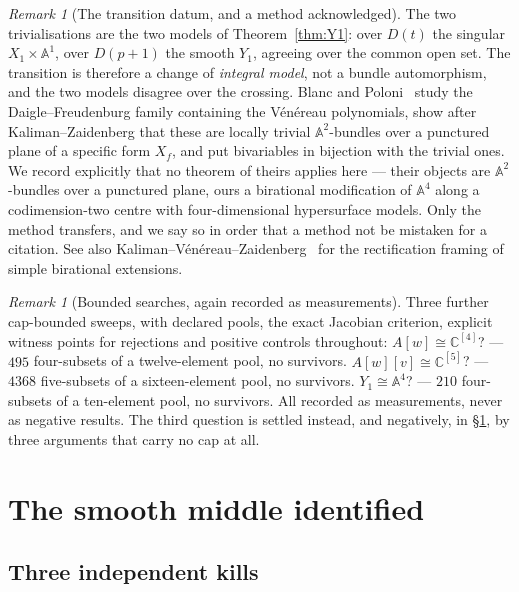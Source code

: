 \documentclass[11pt]{article}
\theoremstyle{definition}
\theoremstyle{remark}
\newtheorem{remark}[theorem]{Remark}
\newcommand{\C}{\mathbb{C}}
\newcommand{\Aff}[1]{\mathbb{A}^{#1}}
\begin{document}
\begin{remark}[The transition datum, and a method
acknowledged]\label{rem:blancpoloni}
The two trivialisations are the two models of Theorem~\ref{thm:Y1}: over
$D(t)$ the singular $X_1\times\Aff{1}$, over $D(p+1)$ the smooth $Y_1$,
agreeing over the common open set. The transition is therefore a change of
\emph{integral model}, not a bundle automorphism, and the two models disagree
over the crossing. Blanc and Poloni~\cite{BP2020} study the
Daigle--Freudenburg family containing the V\'en\'ereau polynomials, show after
Kaliman--Zaidenberg that these are locally trivial $\Aff{2}$-bundles over a
punctured plane of a specific form $X_f$, and put bivariables in bijection with
the trivial ones. We record explicitly that no theorem of theirs applies here
--- their objects are $\Aff{2}$-bundles over a punctured plane, ours a
birational modification of $\Aff{4}$ along a codimension-two centre with
four-dimensional hypersurface models. Only the method transfers, and we say so
in order that a method not be mistaken for a citation. See also
Kaliman--V\'en\'ereau--Zaidenberg~\cite{KVZ2001} for the rectification framing
of simple birational extensions.
\end{remark}

\begin{remark}[Bounded searches, again recorded as
measurements]\label{rem:sweeps2}
Three further cap-bounded sweeps, with declared pools, the exact Jacobian
criterion, explicit witness points for rejections and positive controls
throughout: $A[w]\cong\C^{[4]}$? --- $495$ four-subsets of a twelve-element
pool, no survivors. $A[w][v]\cong\C^{[5]}$? --- $4368$ five-subsets of a
sixteen-element pool, no survivors. $Y_1\cong\Aff{4}$? --- $210$ four-subsets
of a ten-element pool, no survivors. All recorded as measurements, never as
negative results. The third question is settled instead, and negatively, in
\S\ref{sec:Y1}, by three arguments that carry no cap at all.
\end{remark}

\section{The smooth middle identified}\label{sec:Y1}

\subsection{Three independent kills}
\end{document}
